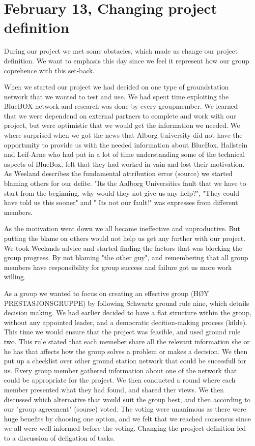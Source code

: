 \section{February 13, Changing project definition}

During our project we met some obstacles, which made us change our project definition. We want to emphasis this day since we feel it represent how our group coprehence with this set-back.

When we started our project we had decided on one type of groundstation network that we wanted to test and use. We had spent time exploiting the BlueBOX network and research was done by every groupmember. We learned that we were dependend on external partners to complete and work with our project, but were optimistic that we would get the information we needed. We where surprised when we got the news that Alborg University did not have the opportunity to provide us with the needed information about BlueBox. Hallstein and Leif-Arne who had put in a lot of time understanding some of the technical aspects of BlueBox, felt that they had worked in vain and lost their motivation. As Weeland describes the fundamental attribution error (source) we started blaming others for our defite. "Its the Aalborg Universities fault that we have to start from the beginning, why would they not give us any help?", "They could have told us this sooner" and " Its not our fault!" was expresses from different members. 

As the motivation went down we all became ineffective and unproductive. But putting the blame on others would not help us get any further with our project. We took Weelands advice and started finding the factors that was blocking the group progress. By not blaming "the other guy", and remembering that all group members have responsibility for group success and failure got us more work willing. 

As a group we wanted to focus on creating an effective group (HØY PRESTASJONSGRUPPE) by following Schwartz ground rule nine, which details decision making. We had earlier decided to have a flat structure within the group, without any appointed leader, and a democratic decition-making process (kilde). This time we would ensure that the project was feasible, and used ground rule two. This rule stated that each memeber share all the relevant information she or he has that affects how the group solves a problem or makes a decision. We then put up a checklist over other ground station network that could be sucessfull for us. Every group member gathered information about one of the network that could be appropriate for the project. We then conducted a round where each member presented what they had found, and shared ther views. We then discussed which alternative that would suit the group best, and then according to our "group agreement" (sourse) voted. The voting were unanimous as there were huge benefits by choosing one option, and we felt that we reached consensus since we all were well informed before the voting. Changing the prosject definition led to a discussion of deligation of tasks. 

